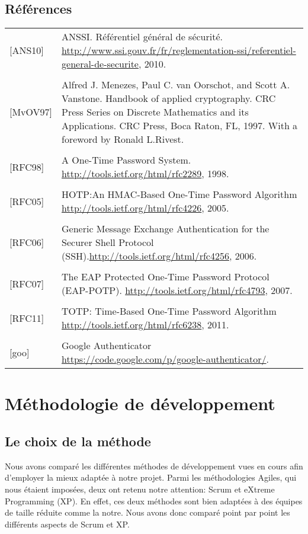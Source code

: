 \documentclass{../../res/univ-projet}
\begin{document}
\subsection{Références}
	\begin{tabular}{p{}>{\raggedright\arraybackslash}p{13cm}}
		{[ANS10]} & {ANSSI. Référentiel général de sécurité. \href{http://www.ssi.gouv.fr/fr/reglementation-ssi/referentiel-general-de-securite}{http://www.ssi.gouv.fr/fr/reglementation-ssi/referentiel-general-de-securite}, 2010.}
		\tabularnewline
		\\
		{[MvOV97]} & {Alfred J. Menezes, Paul C. van Oorschot, and Scott A. Vanstone. Handbook of applied cryptography. CRC Press Series on Discrete Mathematics and its Applications. CRC Press, Boca Raton, FL, 1997. With a foreword by Ronald L.Rivest.}
		\tabularnewline
		\\
		{[RFC98]} & {A One-Time Password System. \href{http://tools.ietf.org/html/rfc2289}{http://tools.ietf.org/html/rfc2289}, 1998.}
		\tabularnewline
		\\
		{[RFC05]} & {HOTP:An HMAC-Based One-Time Password Algorithm \href{http://tools.ietf.org/html/rfc4226}{http://tools.ietf.org/html/rfc4226}, 2005.}
		\tabularnewline
		\\
		{[RFC06]} & {Generic Message Exchange Authentication for the Securer Shell Protocol (SSH).\href{http://tools.ietf.org/html/rfc4256}{http://tools.ietf.org/html/rfc4256}, 2006.}
		\tabularnewline
		\\
		{[RFC07]} & {The EAP Protected One-Time Password Protocol (EAP-POTP). \href{http://tools.ietf.org/html/rfc4793}{http://tools.ietf.org/html/rfc4793}, 2007.}
		\tabularnewline
		\\
		{[RFC11]} & {TOTP: Time-Based One-Time Password Algorithm \href{http://tools.ietf.org/html/rfc6238}{http://tools.ietf.org/html/rfc6238}, 2011.}
		\tabularnewline
		\\
		{[goo]} & {Google Authenticator \href{https://code.google.com/p/google-authenticator/}{https://code.google.com/p/google-authenticator/}.}
	\end{tabular}
	
\newpage
\section{Méthodologie de développement}
\subsection{Le choix de la méthode}
	Nous avons comparé les différentes méthodes de développement vues en cours afin d'employer la mieux adaptée à notre projet. Parmi les méthodologies Agiles, qui nous étaient imposées, deux ont retenu notre attention: Scrum et eXtreme Programming (XP). En effet, ces deux méthodes sont bien adaptées à des équipes de taille réduite comme la notre. Nous avons donc comparé point par point les différents aspects de Scrum et XP.\\
\end{document}
